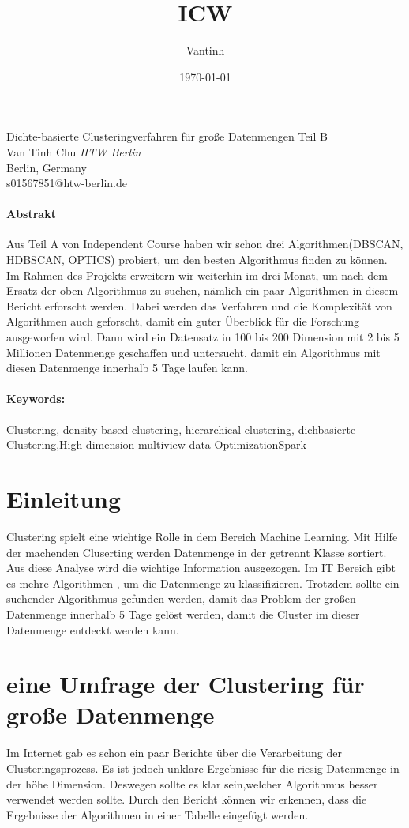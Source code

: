 \documentclass[13pt,a4paper,oneside]{article}
\author{Vantinh}
\title{ICW}
\date{\today}
\begin{document}
\begin{center}
{\Huge Dichte-basierte Clusteringverfahren für große Datenmengen Teil B}\\
Van Tinh Chu
\textit{HTW Berlin}\\
Berlin, Germany\\
s01567851@htw-berlin.de
\end{center}

\tableofcontents%
\listoffigures%
\listoftables%

\newpage
\paragraph{Abstrakt}
Aus Teil  A von Independent  Course haben wir schon drei Algorithmen(DBSCAN, HDBSCAN, OPTICS) probiert, um den besten Algorithmus finden zu können. Im Rahmen des Projekts erweitern wir weiterhin im drei Monat, um nach dem Ersatz der oben Algorithmus zu suchen, nämlich ein paar Algorithmen in diesem Bericht erforscht werden. Dabei werden das Verfahren und die  Komplexität von Algorithmen auch geforscht, damit ein guter Überblick für die Forschung ausgeworfen wird. Dann wird ein Datensatz in 100 bis 200 Dimension mit 2 bis 5 Millionen Datenmenge geschaffen und untersucht, damit ein Algorithmus mit diesen Datenmenge innerhalb 5 Tage laufen kann.
\paragraph{Keywords:} Clustering, density-based clustering, hierarchical clustering, dichbasierte Clustering,High dimension multiview data OptimizationSpark
\section{Einleitung}
Clustering spielt eine wichtige Rolle in dem Bereich Machine Learning. Mit Hilfe der machenden Cluserting werden Datenmenge in der getrennt Klasse sortiert. Aus diese Analyse wird die wichtige Information ausgezogen. Im IT Bereich gibt es mehre Algorithmen , um die Datenmenge zu klassifizieren. Trotzdem sollte ein suchender Algorithmus gefunden werden, damit das Problem der großen Datenmenge innerhalb 5 Tage gelöst werden, damit die Cluster im dieser  Datenmenge entdeckt werden kann.
\section{eine Umfrage der Clustering für große Datenmenge}
Im Internet gab es schon ein paar Berichte über die Verarbeitung der  Clusteringsprozess. Es ist jedoch unklare Ergebnisse für die riesig  Datenmenge in der höhe Dimension. Deswegen sollte es klar sein,welcher Algorithmus besser verwendet werden sollte. Durch den Bericht \cite{6832486} können wir erkennen, dass die Ergebnisse der Algorithmen in einer Tabelle eingefügt werden.
\end{document}
